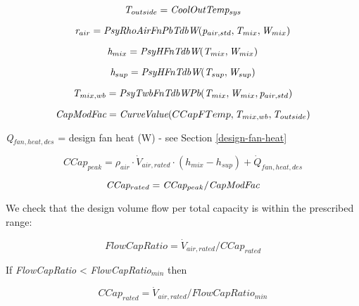\begin{equation}
\emph{T\(_{outside}\)} = \emph{CoolOutTemp\(_{sys}\)}
\end{equation}

\begin{equation}
\emph{r\(_{air}\)} = \emph{PsyRhoAirFnPbTdbW}(\emph{p\(_{air,std}\)}, \emph{T\(_{mix}\)},\emph{W\(_{mix}\)})
\end{equation}

\begin{equation}
\emph{h\(_{mix}\)} = \emph{PsyHFnTdbW}(\emph{T\(_{mix}\)},\emph{W\(_{mix}\)})
\end{equation}

\begin{equation}
\emph{h\(_{sup}\)} = \emph{PsyHFnTdbW}(\emph{T\(_{sup}\)},\emph{W\(_{sup}\)})
\end{equation}

\begin{equation}
\emph{T\(_{mix,wb}\)} = \emph{PsyTwbFnTdbWPb}(\emph{T\(_{mix}\)},\emph{W\(_{mix}\)}, \emph{p\(_{air,std}\)})
\end{equation}

\begin{equation}
\emph{CapModFac} = \emph{CurveValue}(CCapFTemp,\emph{T\(_{mix,wb}\)},\emph{T\(_{outside}\)})
\end{equation}

\emph{Q\(_{fan,heat,des}\)} = design fan heat (W) - see Section \ref{design-fan-heat}

\begin{equation}
CCap_{peak} = \rho_{air} \cdot \dot V_{air,rated} \cdot (h_{mix} - h_{sup}) + \dot{Q}_{fan,heat,des}
\end{equation}

\begin{equation}
\emph{CCap\(_{rated}\)} = \emph{CCap\(_{peak}\)}/ \emph{CapModFac}
\end{equation}

We check that the design volume flow per total capacity is within the prescribed range:

\begin{equation}
FlowCapRatio = \dot V_{air,rated}/CCap_{rated}
\end{equation}

If \emph{FlowCapRatio} \textless{} \emph{FlowCapRatio\(_{min}\)} then

\begin{equation}
CCap_{rated} = \dot V_{air,rated}/FlowCapRatio_{min}
\end{equation}

